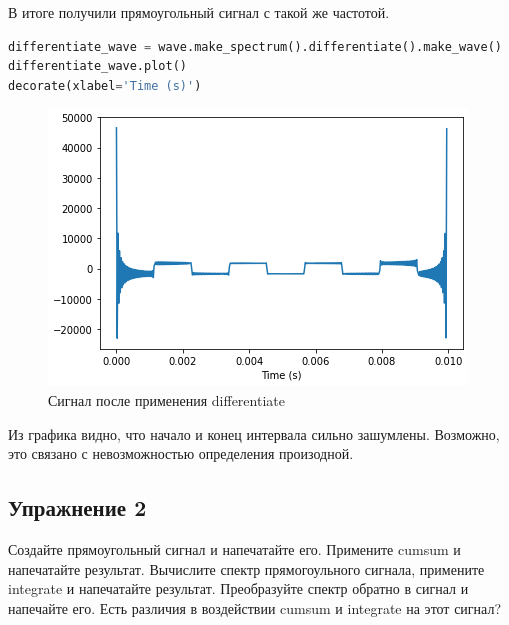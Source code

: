 В итоге получили прямоугольный сигнал с такой же частотой.

\begin{lstlisting}[language=Python]
differentiate_wave = wave.make_spectrum().differentiate().make_wave()
differentiate_wave.plot()
decorate(xlabel='Time (s)')
\end{lstlisting}
\begin{figure}[H]
	\begin{center}
		\includegraphics[scale=1]{fig/lab09/lab9_3.png}
		\caption{Сигнал после применения differentiate}
	\end{center}
\end{figure}

Из графика видно, что начало и конец интервала сильно зашумлены. Возможно, это связано с невозможностью определения произодной.

\subsection{Упражнение 2}

Создайте прямоугольный сигнал и напечатайте его. Примените cumsum и напечатайте результат. Вычислите спектр прямогоульного сигнала, примените integrate и напечатайте результат. Преобразуйте спектр обратно в сигнал и напечайте его. Есть различия в воздействии cumsum и integrate на этот сигнал?

